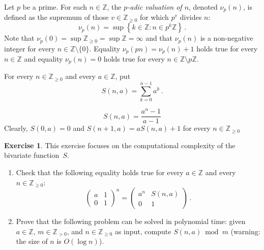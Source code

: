 \documentclass[12pt]{article}
\newcommand{\bZ}{\mathbb{Z}}
\newcommand{\bN}{\bZ_{\ge 0}}%
\newcommand{\bNast}{ \bZ_{> 0}} %
\newtheorem{theorem}{Theorem}
\theoremstyle{definition}
\newtheorem{exercise}{Exercise}
\begin{document}
Let $p$ be a prime.
For each $n \in \bZ$, the \emph{$p$-adic valuation of $n$}, denoted $\nu_p(n)$,
is defined as the supremum of those $v \in \bN$ for which $p^v$ divides $n$:
$$
\nu_p(n) = \sup \left\{ k \in \bZ : n \in p^k \bZ \right\} \, .
$$
Note that $\nu_p(0) = \sup \bN = \sup \bZ = \infty$ and that
$\nu_p(n)$ is a non-negative integer for every $n \in \bZ \setminus \{ 0 \}$.
Equality $\nu_p(pn) = \nu_p(n) + 1$ holds true for every $n \in \bZ$
and
equality $\nu_p(n) = 0$ holds true for every $n \in \bZ \setminus p \bZ$.

For every $n \in \bN$ and every $a \in \bZ$, put
$$
S(n, a) = \sum_{k = 0}^{n - 1} a^k \, . 
$$

$$
S(n, a) = \frac{a^n - 1}{a - 1} 
$$
Clearly, $S(0, a) = 0$ and $S(n + 1, a) = a S(n, a) + 1$ for every $n \in \bN$  
 

\begin{exercise}
  This exercise focuses on the computational complexity of the bivariate function~$S$.
  \begin{enumerate}
  \item Check that the following equality holds true for every $a \in \bZ$ and every $n \in \bN$:
    $$
    \begin{pmatrix} a & 1 \\ 0 & 1 \end{pmatrix}^n = \begin{pmatrix} a^n & S(n, a) \\ 0 & 1 
    \end{pmatrix}
    \, . 
    $$
  \item  Prove that the following problem can be solved in polynomial time:
    given $a \in \bZ$, $m \in \bNast$, and $n \in \bN$ as input,
    compute $S(n, a) \bmod m$ (warning: the size of $n$ is $O( \log n)$).
\end{enumerate}
\end{exercise}
\end{document}
